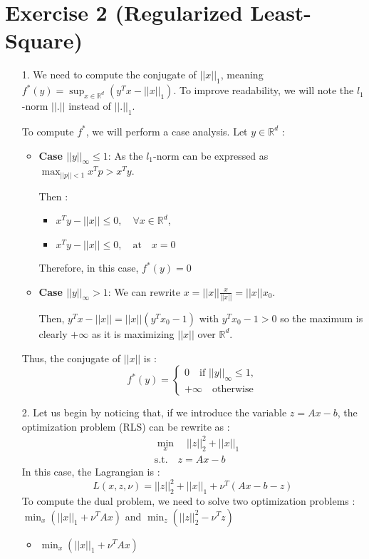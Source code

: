 \documentclass{article}
\begin{document}
\section*{Exercise 2 (Regularized Least-Square)}
    \begin{itemize}
        \item [1.] We need to compute the conjugate of $||x||_1$, meaning $f^*(y)=\sup_{x\in\mathbb{R}^d}(y^Tx-||x||_1)$. To improve readability, we will note the $l_1$-norm $||.||$ instead of $||.||_1$.

        To compute $f^*$, we will perform a case analysis. Let $y\in\mathbb{R}^d$ : 
        \begin{itemize}
            \item \textbf{Case $||y||_\infty\leq 1$}: As the $l_1$-norm can be expressed as $\max_{||p||<1}x^Tp>x^Ty$. 

            Then :
            \begin{itemize}
                \item $x^Ty-||x||\leq0, \quad \forall x\in\mathbb{R}^d$,
                \item $x^Ty-||x||\leq0, \quad \text{at} \quad x=0$
            \end{itemize}
            Therefore, in this case, $f^*(y)=0$
            \item \textbf{Case $||y||_\infty> 1$}: We can rewrite $x=||x||\frac{x}{||x||} = ||x||x_0$.
            
            Then, $y^Tx-||x||=||x||(y^Tx_0-1)$ with $y^Tx_0-1 > 0$ so the maximum is clearly $+\infty$ as it is maximizing $||x||$ over $\mathbb{R}^d$.
        \end{itemize}
        Thus, the conjugate of $||x||$ is :
        \begin{equation}
            f^*(y)=
            \begin{cases}
                0 \quad \text{if } ||y||_\infty\leq 1,\\
                +\infty \quad\text{otherwise}
            \end{cases}
        \end{equation}
        \item[2.]  Let us begin by noticing that, if we introduce the variable $z=Ax-b$, the optimization problem (RLS) can be rewrite as : 
        \begin{equation}
            \begin{aligned}
                & \min_x \quad ||z||_2^2+||x||_1 \\
                & \text{s.t.} \quad z=Ax-b
            \end{aligned}
        \end{equation}
        In this case, the Lagrangian is :
        \begin{equation}
            L(x,z,\nu)=||z||_2^2+||x||_1+\nu^T(Ax-b-z)
        \end{equation}
        To compute the dual problem, we need to solve two optimization problems : $\min_x(||x||_1+\nu^TAx)$ and $\min_z(||z||_2^2-\nu^Tz)$
        \begin{itemize}
            \item $\min_x(||x||_1+\nu^TAx)$
            

\end{itemize}
\end{itemize}
\end{document}
